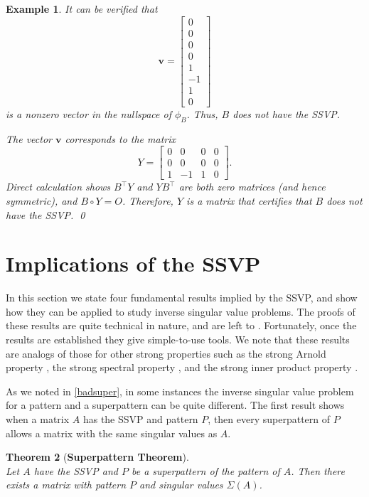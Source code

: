 \documentclass[preprint,12pt]{elsarticle}
\newcommand{\trans  }{^\top}
\newtheorem{theorem}{Theorem}[section]
\newtheorem{Example}[theorem]{Example}
\begin{document}
\begin{Example}
It can be verified that 
\[
    \mathbf v = \left[ \begin{array}{r}
        0\\
        0\\
        0\\
        0\\
        1\\
        -1\\ 
        1\\
        0
    \end{array} \right] 
\]
is  a nonzero vector in the nullspace of $\phi_B$. 
Thus, $B$ does not have the SSVP.

The vector $\mathbf v$ corresponds to the matrix
\[
    Y = \left[ \begin{array}{rrrr}
        0 & 0 & 0 & 0\\
        0 & 0 & 0 & 0\\
        1 & -1 & 1 & 0
\end{array} 
\right]. 
\] 
Direct calculation shows $B\trans Y$ and $YB\trans$ are 
both zero matrices (and hence symmetric), and $B \circ Y = O$. Therefore, $Y$ is a matrix that certifies that $B$ does not have the SSVP. 
\qed
\end{Example}



\section{Implications of the SSVP}

In this section we state four fundamental results implied by the SSVP, 
and show how they can be applied to study inverse singular value problems.  The proofs of these results are quite technical in nature, and are left to . Fortunately, once the results are established they give simple-to-use tools. 
We note that these results are analogs of those for other strong properties
such as the strong Arnold property \cite{CdV},
the strong spectral property \cite{BARRETT2015}, 
and the strong inner product property
\cite{CS2020}. 

As we noted in \cref{badsuper},  in some instances the inverse singular value problem for a pattern and a superpattern can be quite different.  The first result shows when a matrix $A$ has the SSVP and pattern $P$, then 
every superpattern of $P$ allows a matrix with the same singular values 
as $A$. 

\begin{theorem}[\bf Superpattern Theorem] 
\label{superpattern}
\phantom{ } \\
    Let $A$ have the SSVP and $P$ be a superpattern of the pattern of $A$. Then there exists a matrix
    with pattern $P$ and singular values $\Sigma(A)$. 
\end{theorem}
\end{document}
